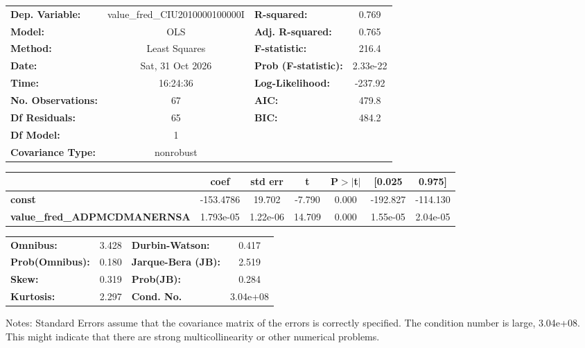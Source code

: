 \begin{center}
\begin{tabular}{lclc}
\toprule
\textbf{Dep. Variable:}              & value\_fred\_CIU2010000100000I & \textbf{  R-squared:         } &     0.769   \\
\textbf{Model:}                      &              OLS               & \textbf{  Adj. R-squared:    } &     0.765   \\
\textbf{Method:}                     &         Least Squares          & \textbf{  F-statistic:       } &     216.4   \\
\textbf{Date:}                       &        Sat, 31 Oct 2026        & \textbf{  Prob (F-statistic):} &  2.33e-22   \\
\textbf{Time:}                       &            16:24:36            & \textbf{  Log-Likelihood:    } &   -237.92   \\
\textbf{No. Observations:}           &                 67             & \textbf{  AIC:               } &     479.8   \\
\textbf{Df Residuals:}               &                 65             & \textbf{  BIC:               } &     484.2   \\
\textbf{Df Model:}                   &                  1             & \textbf{                     } &             \\
\textbf{Covariance Type:}            &           nonrobust            & \textbf{                     } &             \\
\bottomrule
\end{tabular}
\begin{tabular}{lcccccc}
                                     & \textbf{coef} & \textbf{std err} & \textbf{t} & \textbf{P$> |$t$|$} & \textbf{[0.025} & \textbf{0.975]}  \\
\midrule
\textbf{const}                       &    -153.4786  &       19.702     &    -7.790  &         0.000        &     -192.827    &     -114.130     \\
\textbf{value\_fred\_ADPMCDMANERNSA} &    1.793e-05  &     1.22e-06     &    14.709  &         0.000        &     1.55e-05    &     2.04e-05     \\
\bottomrule
\end{tabular}
\begin{tabular}{lclc}
\textbf{Omnibus:}       &  3.428 & \textbf{  Durbin-Watson:     } &    0.417  \\
\textbf{Prob(Omnibus):} &  0.180 & \textbf{  Jarque-Bera (JB):  } &    2.519  \\
\textbf{Skew:}          &  0.319 & \textbf{  Prob(JB):          } &    0.284  \\
\textbf{Kurtosis:}      &  2.297 & \textbf{  Cond. No.          } & 3.04e+08  \\
\bottomrule
\end{tabular}
\end{center}

Notes: \newline
 [1] Standard Errors assume that the covariance matrix of the errors is correctly specified. \newline
 [2] The condition number is large, 3.04e+08. This might indicate that there are \newline
 strong multicollinearity or other numerical problems.